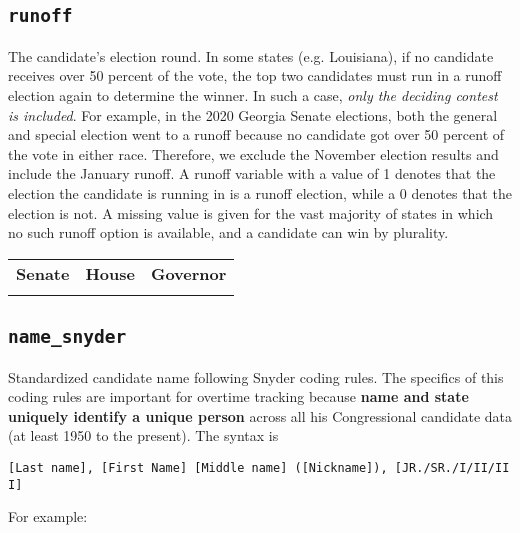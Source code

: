 \documentclass[12pt]{article}
\begin{document}
\FloatBarrier

\subsection*{\texttt{runoff}}

The candidate's election round. In some states (e.g. Louisiana), if no candidate receives over 50 percent of the vote, the top two candidates must run in a runoff election again to determine the winner. 
In such a case, \emph{only the deciding contest is included}. For example, in the 2020 Georgia Senate elections, both the general and special election went to a runoff because no candidate got over 50 percent of the vote in either race. Therefore, we exclude the November election results and include the January runoff. 
A runoff variable with a value of 1 denotes that the election the candidate is running in is a runoff election, while a 0 denotes that the election is not. A missing value is given for the vast majority of states in which no such runoff option is available, and a candidate can win by plurality.
\begin{table}[!h]
\begin{tabularx}{\linewidth}{CCC}
    \textbf{Senate} & \textbf{House} & \textbf{Governor}\\
     &  & 
\end{tabularx}
\end{table}


\FloatBarrier

\subsection*{\texttt{name\_snyder}}


Standardized candidate name following Snyder coding rules. The
specifics of this coding rules are important for overtime tracking because
\textbf{name and state uniquely identify a unique person} across all his
Congressional candidate data (at least 1950 to the present). The syntax
is

\texttt{{[}Last\ name{]},\ {[}First\ Name{]}\ {[}Middle\ name{]}\ ({[}Nickname{]}),\ {[}JR./SR./I/II/III{]}}

For example:
\end{document}
